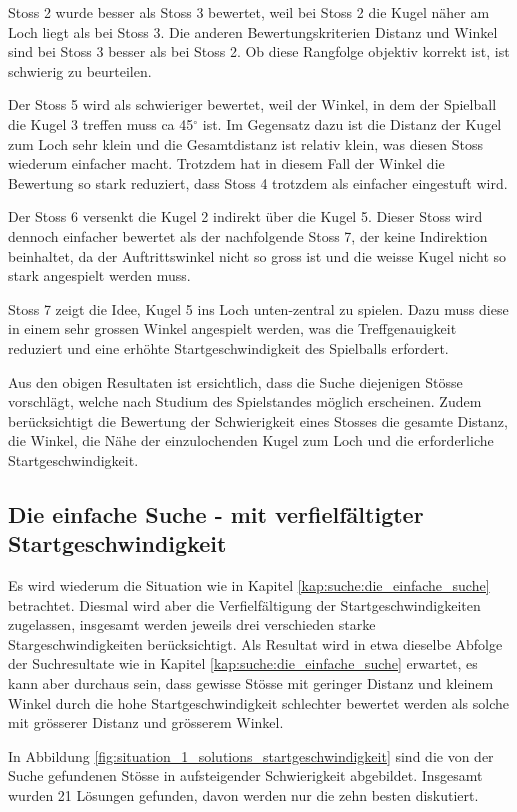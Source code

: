 Stoss 2 wurde besser als Stoss 3 bewertet, weil bei Stoss 2 die Kugel näher am Loch liegt als bei Stoss 3. Die anderen
Bewertungskriterien Distanz und Winkel sind bei Stoss 3 besser als bei Stoss 2.
Ob diese Rangfolge objektiv korrekt ist, ist schwierig zu beurteilen.

Der Stoss 5 wird als schwieriger bewertet, weil der Winkel, in dem der Spielball die Kugel 3 treffen muss ca 45$^{\circ}$ ist.
Im Gegensatz dazu ist die Distanz der Kugel zum Loch sehr klein und die Gesamtdistanz ist relativ klein, was diesen Stoss
wiederum einfacher macht. Trotzdem hat in diesem Fall der Winkel die Bewertung so stark reduziert, dass Stoss 4 trotzdem
als einfacher eingestuft wird.

Der Stoss 6 versenkt die Kugel 2 indirekt über die Kugel 5. Dieser Stoss wird dennoch einfacher bewertet als der
nachfolgende Stoss 7, der keine Indirektion beinhaltet, da der Auftrittswinkel nicht so gross ist und die weisse Kugel
nicht so stark angespielt werden muss.

Stoss 7 zeigt die Idee, Kugel 5 ins Loch unten-zentral zu spielen.
Dazu muss diese in einem sehr grossen Winkel angespielt werden, was die Treffgenauigkeit reduziert und eine
erhöhte Startgeschwindigkeit des Spielballs erfordert.

Aus den obigen Resultaten ist ersichtlich, dass die Suche diejenigen Stösse vorschlägt, welche nach Studium des Spielstandes
möglich erscheinen. Zudem berücksichtigt die Bewertung der Schwierigkeit eines Stosses die gesamte Distanz, die Winkel, die Nähe
der einzulochenden Kugel zum Loch und die erforderliche Startgeschwindigkeit.
\newpage

\subsection{Die einfache Suche - mit verfielfältigter Startgeschwindigkeit}
Es wird wiederum die Situation wie in Kapitel \ref{kap:suche:die_einfache_suche} betrachtet. Diesmal wird aber die Verfielfältigung der Startgeschwindigkeiten
zugelassen, insgesamt werden jeweils drei verschieden starke Stargeschwindigkeiten berücksichtigt.
Als Resultat wird in etwa dieselbe Abfolge der Suchresultate wie in Kapitel \ref{kap:suche:die_einfache_suche} erwartet, es kann aber durchaus
sein, dass gewisse Stösse mit geringer Distanz und kleinem Winkel durch die hohe Startgeschwindigkeit schlechter bewertet werden
als solche mit grösserer Distanz und grösserem Winkel.

In Abbildung \ref{fig:situation_1_solutions_startgeschwindigkeit} sind die von der Suche gefundenen Stösse in aufsteigender Schwierigkeit abgebildet.
Insgesamt wurden 21 Lösungen gefunden, davon werden nur die zehn besten diskutiert.

